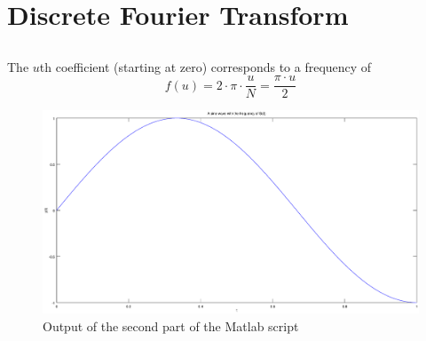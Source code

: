 \documentclass[DIN, pagenumber=false, fontsize=11pt, parskip=half]{scrartcl}
\begin{document}
    \section{Discrete Fourier Transform}
    \subsection{}
                  
    \subsection{}
    The $u$th coefficient (starting at zero) corresponds to a frequency of
    \begin{equation*}
        f(u) = 2 \cdot \pi \cdot \frac{u}{N} = \frac{\pi \cdot u}{2}
    \end{equation*}
                  
    \begin{figure}[H]
        \centering
        \includegraphics[clip,width=\textwidth]{frequency.eps}
        \caption{Output of the second part of the Matlab script}
    \end{figure}
    \subsection{}
                  
\end{document}
